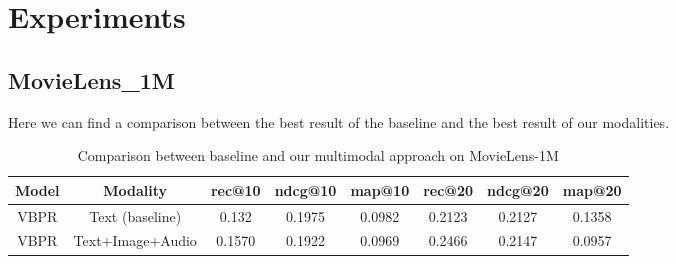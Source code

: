 \section{Experiments}
\subsection{MovieLens\_1M}
Here we can find a comparison between the best result of the baseline \cite{Spillong} and the best result of our modalities.
\begin{table}[H]
    \centering
    \begin{adjustbox}{max width=\textwidth}
    \begin{tabular}{|c|c|c|c|c|c|c|c|}
        \hline
        \textbf{Model} & \textbf{Modality} & \textbf{rec@10} & \textbf{ndcg@10} & \textbf{map@10} & \textbf{rec@20} & \textbf{ndcg@20} & \textbf{map@20} \\
        \hline
        VBPR & Text (baseline) & 0.132 & 0.1975 & 0.0982 & 0.2123 & 0.2127 & 0.1358 \\
        \hline
        VBPR & Text+Image+Audio & 0.1570 & 0.1922 & 0.0969 & 0.2466 & 0.2147 & 0.0957 \\
        \hline
    \end{tabular}
    \end{adjustbox}
    \caption{Comparison between baseline and our multimodal approach on MovieLens-1M}
    \label{tab:vbpr_movielens_comparison}
\end{table}
